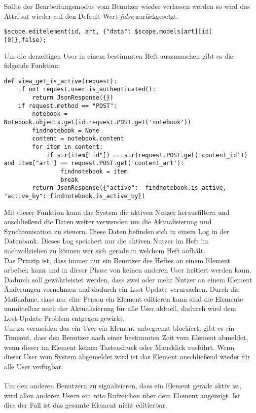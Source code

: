 Sollte der Bearbeitungsmodus vom Benutzer wieder verlassen werden so wird das Attribut wieder auf den Default-Wert \textit{false} zurückgesetzt.
\begin{lstlisting}[caption={Bearbeitungsmodus false - PWS}]
$scope.editelement(id, art, {"data": $scope.models[art][id][0]},false);
\end{lstlisting}

Um die derzeitigen User in einem bestimmten Heft auszumachen gibt es die folgende Funktion:
\begin{lstlisting}[caption={Abfrage der aktiven Nutzer - PWS}]
def view_get_is_active(request):
    if not request.user.is_authenticated():
        return JsonResponse({})
    if request.method == "POST":
        notebook = Notebook.objects.get(id=request.POST.get('notebook'))
        findnotebook = None
        content = notebook.content
        for item in content:
            if str(item["id"]) == str(request.POST.get('content_id')) and item["art"] == request.POST.get('content_art'):
                findnotebook = item
                break
        return JsonResponse({"active":  findnotebook.is_active, "active_by": findnotebook.is_active_by})
\end{lstlisting}
Mit dieser Funktion kann das System die aktiven Nutzer herausfiltern und anschließend die Daten weiter verwenden um die Aktualisierung und Synchronisation zu steuern. Diese Daten befinden sich in einem Log in der Datenbank. Dieses Log speichert nur die aktiven Nutzer im Heft im nachvollziehen zu können wer sich gerade in welchem Heft aufhält.
\\
Das Prinzip ist, dass immer nur ein Benutzer des Heftes an einem Element arbeiten kann und in dieser Phase von keinen anderen User irritiert werden kann. Dadurch soll gewährleistet werden, dass zwei oder mehr Nutzer an einem Element Änderungen vornehmen und dadurch ein Lost-Update verursachen. Durch die Maßnahme, dass nur eine Person ein Element editieren kann sind die Elemente unmittelbar nach der Aktualisierung für alle User aktuell, dadurch wird dem Lost-Update Problem entgegen gewirkt.\\
Um zu vermeiden das ein User ein Element unbegrenzt blockiert, gibt es ein Timeout, dass den Benutzer nach einer bestimmten Zeit vom Element abmeldet, wenn dieser im Element keinen Tastendruck oder Mausklick ausführt. Wenn dieser User vom System abgemeldet wird ist das Element anschließend wieder für alle User verfügbar.\\
\\
Um den anderen Benutzern zu signalisieren, dass ein Element gerade aktiv ist, wird allen anderen Usern ein rote Rufzeichen über dem Element angezeigt. Ist dies der Fall ist das gesamte Element nicht editierbar. 
